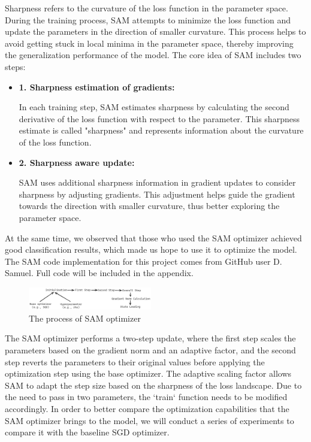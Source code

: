 \documentclass[twocolumn]{article}
\begin{document}
    Sharpness refers to the curvature of the loss function in the parameter space. During the training process, SAM attempts to minimize the loss function and update the parameters in the direction of smaller curvature. This process helps to avoid getting stuck in local minima in the parameter space, thereby improving the generalization performance of the model\cite{pmlr-v162-andriushchenko22a}. The core idea of SAM includes two steps:

    \begin {itemize}
        \item \textbf{1. Sharpness estimation of gradients:} 
        
        In each training step, SAM estimates sharpness by calculating the second derivative of the loss function with respect to the parameter. This sharpness estimate is called "sharpness" and represents information about the curvature of the loss function.

        \item \textbf{2. Sharpness aware update:} 
        
        SAM uses additional sharpness information in gradient updates to consider sharpness by adjusting gradients. This adjustment helps guide the gradient towards the direction with smaller curvature, thus better exploring the parameter space.
    \end {itemize}

    At the same time, we observed that those who used the SAM optimizer achieved good classification results, which made us hope to use it to optimize the model. The SAM code implementation for this project comes from GitHub user D. Samuel\cite{githubGitHubDavda54sam}. Full code will be included in the appendix.

    \begin{figure}[ht]
        \centering
        \includegraphics[width=0.48\textwidth]{sam_process.png}
        \caption{The process of SAM optimizer}
        \label{fig:sam_process}
    \end{figure}

    The SAM optimizer performs a two-step update, where the first step scales the parameters based on the gradient norm and an adaptive factor, and the second step reverts the parameters to their original values before applying the optimization step using the base optimizer. The adaptive scaling factor allows SAM to adapt the step size based on the sharpness of the loss landscape. Due to the need to pass in two parameters, the `train` function needs to be modified accordingly. In order to better compare the optimization capabilities that the SAM optimizer brings to the model, we will conduct a series of experiments to compare it with the baseline SGD optimizer.
\end{document}
